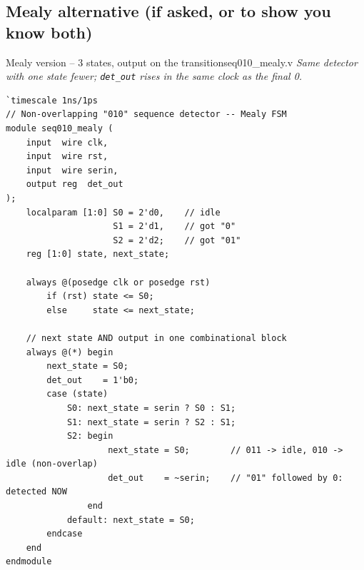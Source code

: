 \documentclass[10pt,a4paper]{article}
\newcommand{\slicenote}[1]{{\small\color{black!70}\itshape #1}\par\smallskip}
\begin{document}
\subsection{Mealy alternative (if asked, or to show you know both)}
\begin{center}
\end{center}
\begin{codeslice}{Mealy version -- 3 states, output on the transition}{seq010\_mealy.v}
\slicenote{Same detector with one state fewer; \texttt{det\_out} rises in the same clock as the final 0.}
\begin{lstlisting}
`timescale 1ns/1ps
// Non-overlapping "010" sequence detector -- Mealy FSM
module seq010_mealy (
    input  wire clk,
    input  wire rst,
    input  wire serin,
    output reg  det_out
);
    localparam [1:0] S0 = 2'd0,    // idle
                     S1 = 2'd1,    // got "0"
                     S2 = 2'd2;    // got "01"
    reg [1:0] state, next_state;

    always @(posedge clk or posedge rst)
        if (rst) state <= S0;
        else     state <= next_state;

    // next state AND output in one combinational block
    always @(*) begin
        next_state = S0;
        det_out    = 1'b0;
        case (state)
            S0: next_state = serin ? S0 : S1;
            S1: next_state = serin ? S2 : S1;
            S2: begin
                    next_state = S0;        // 011 -> idle, 010 -> idle (non-overlap)
                    det_out    = ~serin;    // "01" followed by 0: detected NOW
                end
            default: next_state = S0;
        endcase
    end
endmodule
\end{lstlisting}
\end{codeslice}
\end{document}
